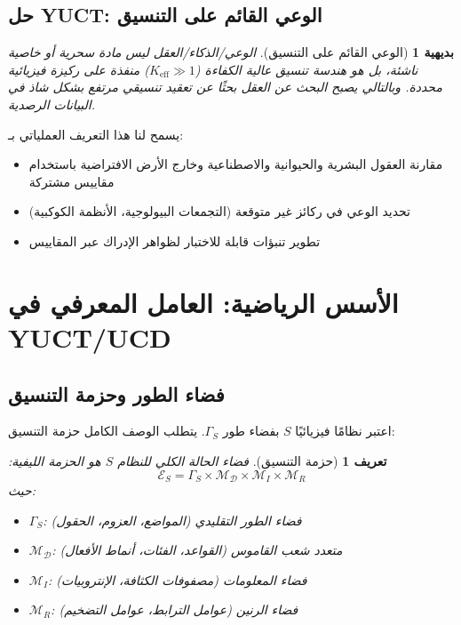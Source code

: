 \documentclass[12pt,a4paper]{article}
\newtheorem{definition}{تعريف}
\newtheorem{axiom}{بديهية}
\newcommand{\eff}{\mathrm{eff}}
\newcommand{\Dict}{\mathcal{D}}
\newcommand{\Mdict}{\mathcal{M}_{\Dict}}
\newcommand{\Ke}{K_{\eff}}
\begin{document}
	\subsection{حل YUCT: الوعي القائم على التنسيق}
	
	\begin{axiom}[الوعي القائم على التنسيق]
		الوعي/الذكاء/العقل ليس مادة سحرية أو خاصية ناشئة، بل هو هندسة تنسيق عالية الكفاءة (\(\Ke \gg 1\)) منفذة على ركيزة فيزيائية محددة. وبالتالي يصبح البحث عن العقل بحثًا عن تعقيد تنسيقي مرتفع بشكل شاذ في البيانات الرصدية.
	\end{axiom}
	
	يسمح لنا هذا التعريف العملياتي بـ:
	\begin{itemize}
		\item مقارنة العقول البشرية والحيوانية والاصطناعية وخارج الأرض الافتراضية باستخدام مقاييس مشتركة
		\item تحديد الوعي في ركائز غير متوقعة (التجمعات البيولوجية، الأنظمة الكوكبية)
		\item تطوير تنبؤات قابلة للاختبار لظواهر الإدراك عبر المقاييس
	\end{itemize}
	
	\section{الأسس الرياضية: العامل المعرفي في YUCT/UCD}
	
	\subsection{فضاء الطور وحزمة التنسيق}
	
	اعتبر نظامًا فيزيائيًا \(S\) بفضاء طور \(\Gamma_S\). يتطلب الوصف الكامل حزمة التنسيق:
	
	\begin{definition}[حزمة التنسيق]
		فضاء الحالة الكلي للنظام \(S\) هو الحزمة الليفية:
		\[
		\mathcal{E}_S = \Gamma_S \times \Mdict \times \mathcal{M}_I \times \mathcal{M}_R
		\]
		حيث:
		\begin{itemize}
			\item \(\Gamma_S\): فضاء الطور التقليدي (المواضع، العزوم، الحقول)
			\item \(\Mdict\): متعدد شعب القاموس (القواعد، الفئات، أنماط الأفعال)
			\item \(\mathcal{M}_I\): فضاء المعلومات (مصفوفات الكثافة، الإنتروبيات)
			\item \(\mathcal{M}_R\): فضاء الرنين (عوامل الترابط، عوامل التضخيم)
		\end{itemize}
	\end{definition}
	
\end{document}
